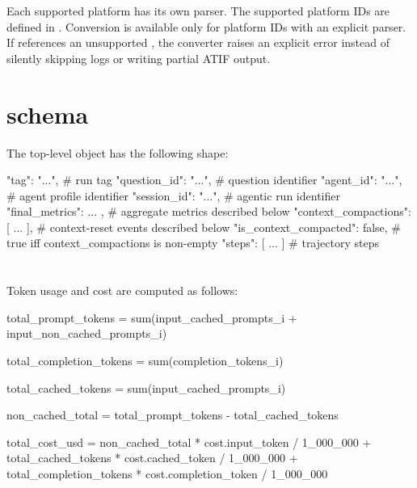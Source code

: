 \documentclass[11pt]{article}
\begin{document}
Each supported platform has its own parser.
The supported platform IDs are defined in .
Conversion is available only for platform IDs with an explicit parser.
If  references an unsupported , the converter raises an explicit error instead of silently skipping logs or writing partial ATIF output.

\section*{\texorpdfstring{}{atif_trajectory.json} schema}

The top-level object has the following shape:

\begin{DocCode}
{
  "tag": "...",                  # run tag
  "question_id": "...",          # question identifier
  "agent_id": "...",             # agent profile identifier
  "session_id": "...",           # agentic run identifier
  "final_metrics": { ... },      # aggregate metrics described below
  "context_compactions": [ ... ], # context-reset events described below
  "is_context_compacted": false, # true iff context_compactions is non-empty
  "steps": [ ... ]               # trajectory steps
}
\end{DocCode}


\section*{\texorpdfstring{}{final_metrics}}
\label{sec:atif-final-metrics}

Token usage and cost are computed as follows:
\begin{DocCode}
total_prompt_tokens =
  sum(input_cached_prompts_i + input_non_cached_prompts_i)

total_completion_tokens =
  sum(completion_tokens_i)

total_cached_tokens =
  sum(input_cached_prompts_i)

non_cached_total =
  total_prompt_tokens - total_cached_tokens
\end{DocCode}

\label{metric:atif-total-cost}
\begin{DocCode}
total_cost_usd =
  non_cached_total * cost.input_token / 1_000_000
  + total_cached_tokens * cost.cached_token / 1_000_000
  + total_completion_tokens * cost.completion_token / 1_000_000
\end{DocCode}
\end{document}
